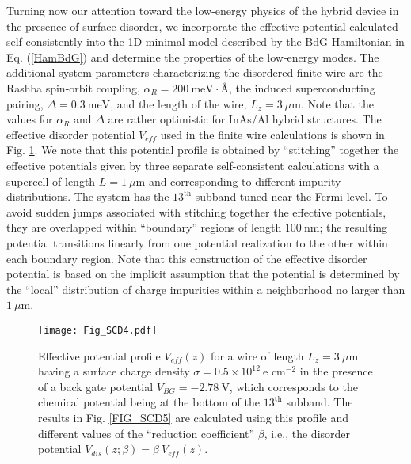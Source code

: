 \documentclass[aps,prmaterials,twocolumn,superscriptaddress,longbibliography]{revtex4-2}
\begin{document}
Turning now our attention toward the low-energy physics of the hybrid device in the presence of surface disorder, we incorporate the effective potential calculated self-consistently into the 1D minimal model described by the BdG Hamiltonian in Eq. (\ref{HamBdG}) and determine the properties of the low-energy modes. 
The additional system parameters characterizing the disordered finite wire are the Rashba spin-orbit coupling, $\alpha_R = 200~\text{meV} \cdot \text{\AA}$, the induced superconducting pairing, $\Delta = 0.3~\text{meV}$, and the length of the wire, $L_z = 3~\mu\text{m}$. Note that the values for $\alpha_R$ and $\Delta$ are rather optimistic for InAs/Al hybrid structures. The effective disorder potential $V_{eff}$ used in the finite wire calculations is shown in Fig. \ref{FIG_SCD4}.
We note that this potential profile is obtained by ``stitching'' together the effective potentials given by three separate self-consistent calculations with a supercell of length $L = 1~\mu\text{m}$ and corresponding to different impurity distributions. The system has the $13^\text{th}$ subband tuned near the Fermi level. 
To avoid sudden jumps associated with stitching together the effective potentials, they are overlapped within ``boundary'' regions of length $100~\text{nm}$; the resulting potential transitions linearly from one potential realization to the other within each boundary region. Note that this construction of the effective disorder potential is based on the implicit assumption that the potential is determined by the ``local'' distribution of charge impurities within a neighborhood no larger than $1~\mu$m.   

\begin{figure}[t]
    \begin{center}
    \texttt{[image: Fig\_SCD4.pdf]}
    \end{center}
    \vspace{-0.5cm}
    \caption{Effective potential profile $V_{eff}(z)$ for a wire of length $L_z=3~\mu$m having a surface charge density $\sigma = 0.5 \times 10^{12}~\text{e cm}^{-2}$ in the presence of a back gate potential $V_{BG}=-2.78~$V, which corresponds to the chemical potential being at the bottom of the $13^\text{th}$ subband. The results in Fig. \ref{FIG_SCD5} are calculated using this profile and different values of the ``reduction coefficient'' $\beta$, i.e., the disorder potential $V_{dis}(z;\beta)=\beta~\!V_{eff}(z)$.}
    \label{FIG_SCD4}
    \vspace{-1mm}
\end{figure}
\end{document}
